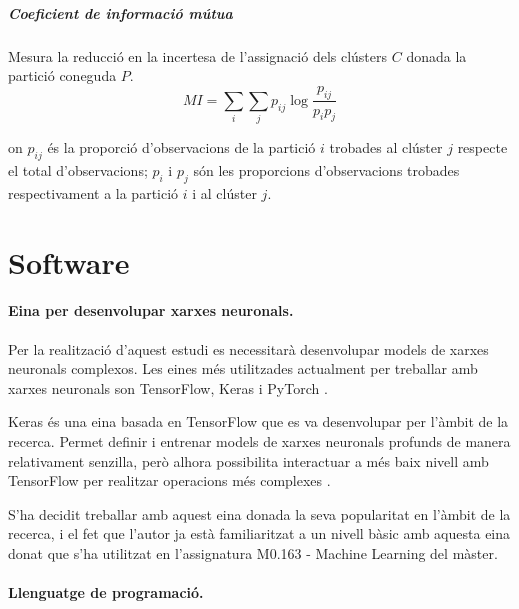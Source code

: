 \documentclass[CAT,BIB]{TFUOC}%
\begin{document}
            \subparagraph{Coeficient de informació mútua}
                Mesura la reducció en la incertesa
                de l'assignació dels clústers $C$
                donada la partició coneguda $P$.
                \begin{equation}
                \label{eq:mi}
                    MI = \sum_i \sum_j p_{ij} \log \frac{p_{ij}}{p_i p_j}
                \end{equation}

                on $p_{ij}$ és la proporció d'observacions
                de la partició $i$ trobades al clúster $j$
                respecte el total d'observacions;
                $p_i$ i $p_j$ són les proporcions d'observacions
                trobades respectivament a la partició $i$
                i al clúster $j$.


    \section{Software}
    \label{s:software}

        \paragraph{Eina per desenvolupar xarxes neuronals.}

            Per la realització d'aquest estudi es necessitarà desenvolupar models de xarxes neuronals complexos. Les eines més utilitzades actualment per treballar amb xarxes neuronals son TensorFlow, Keras i PyTorch \citep{Kaggle2021}.

            Keras \citep{Chollet2015} és una eina basada en TensorFlow \citep{Ghemawat2016} que es va desenvolupar per l'àmbit de la recerca. Permet definir i entrenar models de xarxes neuronals profunds de manera relativament senzilla, però alhora possibilita interactuar a més baix nivell amb TensorFlow per realitzar operacions més complexes \citep{Ketkar2021}.

            S'ha decidit treballar amb aquest eina donada la seva popularitat en l'àmbit de la recerca, i el fet que l'autor ja està familiaritzat a un nivell bàsic amb aquesta eina donat que s'ha utilitzat en l'assignatura M0.163 - Machine Learning del màster.

        \paragraph{Llenguatge de programació.}
\end{document}
